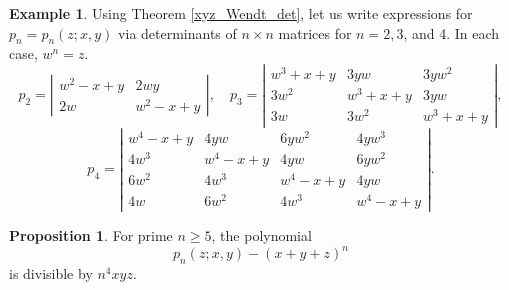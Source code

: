 \documentclass[14pt, dvipsnames]{extarticle}
\theoremstyle{definition}
\newtheorem{prop}{Proposition}
\theoremstyle{definition}
\newtheorem{example}{\bf Example}
\theoremstyle{remark}
\begin{document}
\begin{example}
Using Theorem \ref{xyz_Wendt_det}, let us write expressions for $p_n = p_n(z; x, y)$ via determinants of $n\times n$ matrices for $n = 2, 3$, and 4. In each case, $w^n = z$.
$$p_2 = \left|\begin{array}{cc}
w^{2}-x+y & 2wy\\
2w & w^{2}-x+y
\end{array}\right|,
\quad
p_3 = \left|\begin{array}{ccc}
w^{3}+x+y & 3yw & 3yw^{2}\\
3w^{2} & w^{3}+x+y & 3yw\\
3w & 3w^{2} & w^{3}+x+y
\end{array}\right|,$$
$$
p_4 = \left|\begin{array}{cccc}
w^{4}-x+y & 4yw & 6yw^{2} & 4yw^{3}\\
4w^{3} & w^{4}-x+y & 4yw & 6yw^{2}\\
6w^{2} & 4w^{3} & w^{4}-x+y & 4yw\\
4w & 6w^{2} & 4w^{3} & w^{4}-x+y
\end{array}\right|.
$$
\end{example}

\begin{prop}\label{div_n^4}
For prime $n \geqslant 5$, the polynomial
$$p_n(z; x, y) - (x + y + z)^n$$
is divisible by $n^4xyz$.
\end{prop}
\end{document}
